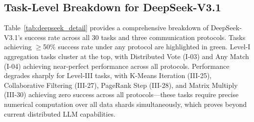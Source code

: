 \subsection{Task-Level Breakdown for DeepSeek-V3.1}
\label{app:task_breakdown}

Table~\ref{tab:deepseek_detail} provides a comprehensive breakdown of DeepSeek-V3.1's success rate across all 30 tasks and three communication protocols. Tasks achieving $\geq$50\% success rate under any protocol are highlighted in green. Level-I aggregation tasks cluster at the top, with Distributed Vote (I-03) and Any Match (I-04) achieving near-perfect performance across all protocols. Performance degrades sharply for Level-III tasks, with K-Means Iteration (III-25), Collaborative Filtering (III-27), PageRank Step (III-28), and Matrix Multiply (III-30) achieving zero success across all protocols---these tasks require precise numerical computation over all data shards simultaneously, which proves beyond current distributed LLM capabilities.

